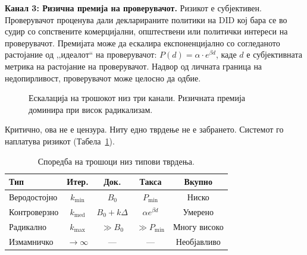 \documentclass[11pt,a4paper,twocolumn]{article}
\begin{document}
\textbf{Канал 3: Ризична премија на проверувачот.} Ризикот е субјективен. Проверувачот проценува дали декларираните политики на DID кој бара се во судир со сопствените комерцијални, општествени или политички интереси на проверувачот. Премијата може да ескалира експоненцијално со согледаното растојание од ,,идеалот`` на проверувачот: $P(d) = \alpha \cdot e^{\beta d}$, каде $d$ е субјективната метрика на растојание на проверувачот. Надвор од личната граница на недопирливост, проверувачот може целосно да одбие.

\begin{figure}[ht]
\centering
{}
\caption{Ескалација на трошокот низ три канали. Ризичната премија доминира при висок радикализам.}
\label{fig:radicalism}
\end{figure}

Критично, ова не е цензура. Ниту едно тврдење не е забрането. Системот го наплатува ризикот (Табела~\ref{tab:costs}).

\begin{table}[ht]
\centering
\caption{Споредба на трошоци низ типови тврдења.}
\label{tab:costs}
\footnotesize
\begin{tabular}{@{}lcccc@{}}
\toprule
\textbf{Тип} & \textbf{Итер.} & \textbf{Док.} & \textbf{Такса} & \textbf{Вкупно} \\
\midrule
Веродостојно & $k_{\min}$ & $B_0$ & $P_{\min}$ & Ниско \\
Контроверзно & $k_{\text{med}}$ & $B_0{+}k\Delta$ & $\alpha e^{\beta d}$ & Умерено \\
Радикално & $k_{\max}$ & $\gg B_0$ & $\gg P_{\min}$ & Многу високо \\
Измамничко & $\to\infty$ & --- & --- & Необјавливо \\
\bottomrule
\end{tabular}
\end{table}
\end{document}
